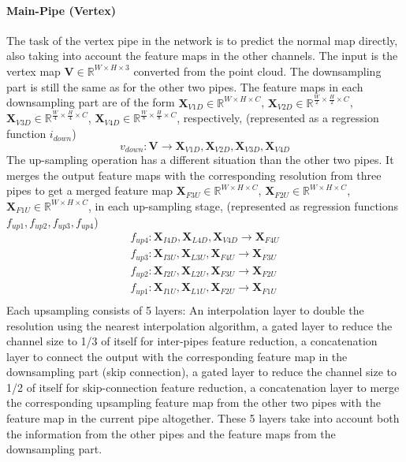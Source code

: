 \paragraph{Main-Pipe (Vertex)}
The task of the vertex pipe in the network is to predict the normal map directly, also taking into account the feature maps in the other channels. The input is the vertex map $ \textbf{V} \in \mathbb{R}^{W\times H\times 3}$ converted from the point cloud. 
The downsampling part is still the same as for the other two pipes. The feature maps in each downsampling part are of the form
$ \textbf{X}_{V1D} \in \mathbb{R}^{{W}\times H\times C} $, 
$ \textbf{X}_{V2D} \in \mathbb{R}^{\frac{W}{2}\times \frac{H}{2}\times C} $,
$ \textbf{X}_{V3D} \in \mathbb{R}^{\frac{W}{4}\times \frac{H}{4}\times C} $,
$ \textbf{X}_{V4D} \in \mathbb{R}^{\frac{W}{8}\times \frac{H}{8}\times C} $, respectively, 
(represented as a regression function $ i_{down} $)
\[ v_{down}: \textbf{V} \rightarrow  \textbf{X}_{V1D} , \textbf{X}_{V2D}, \textbf{X}_{V3D}, \textbf{X}_{V4D} \]
The up-sampling operation has a different situation than the other two pipes.
It merges the output feature maps with the corresponding resolution from three pipes to get a merged feature map 
$ \textbf{X}_{F3U} \in \mathbb{R}^{W\times H\times C} $, 
$\textbf{X}_{F2U} \in \mathbb{R}^{W\times H\times C} $, 
$\textbf{X}_{F1U} \in \mathbb{R}^{W\times H\times C} $,
in each up-sampling stage, (represented as regression functions $ f_{up1}, f_{up2}, f_{up3}, f_{up4}$)
\[ 
\begin{matrix}
	f_{up4} : \textbf{X}_{I4D}, \textbf{X}_{L4D}, \textbf{X}_{V4D} \rightarrow \textbf{X}_{F4U} \\
	f_{up3} : \textbf{X}_{I3U}, \textbf{X}_{L3U}, \textbf{X}_{F4U} \rightarrow \textbf{X}_{F3U} \\
	f_{up2} : \textbf{X}_{I2U}, \textbf{X}_{L2U}, \textbf{X}_{F3U} \rightarrow \textbf{X}_{F2U} \\
	f_{up1} : \textbf{X}_{I1U}, \textbf{X}_{L1U}, \textbf{X}_{F2U} \rightarrow \textbf{X}_{F1U} \\
			
\end{matrix}
\]
Each upsampling consists of 5 layers: An interpolation layer to double the resolution using the nearest interpolation algorithm, a gated layer to reduce the channel size to 1/3 of itself for inter-pipes feature reduction, a concatenation layer to connect the output with the corresponding feature map in the downsampling part (skip connection), a gated layer to reduce the channel size to 1/2 of itself for skip-connection feature reduction, a concatenation layer to merge the corresponding upsampling feature map from the other two pipes with the feature map in the current pipe altogether. These 5 layers take into account both the information from the other pipes and the feature maps from the downsampling part. 

